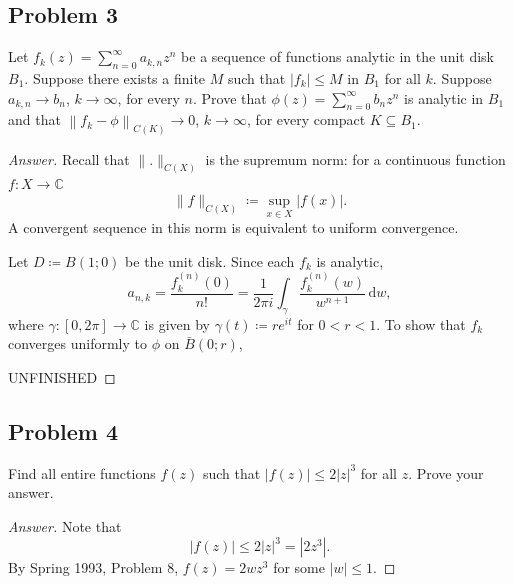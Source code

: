 \documentclass[12pt]{article}
\newcommand{\cx}{\mathbb{C}}
\newcommand{\abs}[1]{\left| #1 \right|}
\newcommand{\norm}[1]{\left\| #1 \right\|}
\theoremstyle{definition}
\begin{document}
\subsection{Problem 3}
Let $f_k(z) = \sum_{n=0}^{\infty} a_{k,n}z^n$ be a sequence of functions analytic in the unit disk $B_1$. Suppose there exists a finite $M$ such that $\abs{ f_k } \leq M$ in $B_1$ for all $k$. Suppose $a_{k,n} \to b_n$, $k \to \infty$, for every $n$. Prove that $\phi(z) = \sum_{n = 0}^{\infty} b_n z^n$ is analytic in $B_1$ and that $\norm{ f_k - \phi }_{C(K)} \to 0$, $k \to \infty$, for every compact $K \subseteq B_1$.
\begin{proof}[Answer]
    Recall that $\| . \|_{C(X)}$ is the supremum norm: for a continuous function $f : X \to \cx$
    \[
        \| f \|_{C(X)} \coloneqq \sup\limits_{x \in X} |f(x)|.
    \]
    A convergent sequence in this norm is equivalent to uniform convergence. 
    
    Let $D \coloneqq B(1;0)$ be the unit disk. Since each $f_k$ is analytic, 
    \[
        a_{n,k} = \frac{f_k^{(n)}(0)}{n!} = \frac{1}{2\pi i} \int_{\gamma} \frac{f_k^{(n)}(w)}{w^{n+1}} \, \mathrm{d}w,
    \]
    where $\gamma : [0,2\pi] \to \cx$ is given by $\gamma(t) \coloneqq re^{it}$ for $0 < r < 1$. To show that $f_k$ converges uniformly to $\phi$ on $\bar{B}(0;r)$,
    
    UNFINISHED
\end{proof}
\subsection{Problem 4}
Find all entire functions $f(z)$ such that $\abs{ f(z) } \leq 2 \abs{z}^3$ for all $z$. Prove your answer.
\begin{proof}[Answer]
    Note that 
    \[
        \abs{ f(z) } \leq 2 \abs{z}^3 = \abs{2z^3}.
    \]
    By Spring 1993, Problem 8, $f(z) = 2wz^3$ for some $|w| \leq 1$.
\end{proof}
\end{document}
